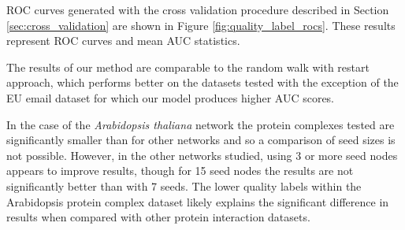 \documentclass[sigconf]{acmart}
\begin{document}
ROC curves generated with the cross validation procedure described in Section \ref{sec:cross_validation} are shown in Figure \ref{fig:quality_label_rocs}.
These results represent ROC curves and mean AUC statistics.

The results of our method are comparable to the random walk with restart approach, which performs better on the datasets tested with the exception of the EU email dataset for which our model produces higher AUC scores.

In the case of the \textit{Arabidopsis thaliana} network the protein complexes tested are significantly smaller than for other networks and so a comparison of seed sizes is not possible.
However, in the other networks studied, using 3 or more seed nodes appears to improve results, though for 15 seed nodes the results are not significantly better than with 7 seeds.
The lower quality labels within the Arabidopsis protein complex dataset likely explains the significant difference in results when compared with other protein interaction datasets.
\end{document}
